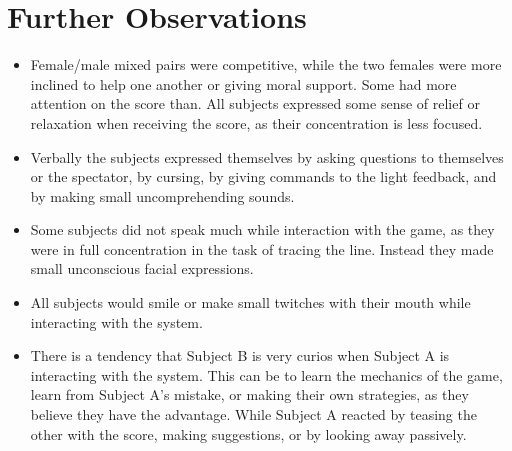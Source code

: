 \section*{Further Observations}\label{fo}
\begin{itemize}
\item Female/male mixed pairs were competitive, while the two females were more inclined to help one another or giving moral support. Some had more attention on the score than. All subjects expressed some sense of relief or relaxation when receiving the score, as their concentration is less focused. 
\item Verbally the subjects expressed themselves by asking questions to themselves or the spectator, by cursing, by giving commands to the light feedback, and by making small uncomprehending sounds. 
\item Some subjects did not speak much while interaction with the game, as they were in full concentration in the task of tracing the line. Instead they made small unconscious facial expressions.
\item All subjects would smile or make small twitches with their mouth while interacting with the system.
\item There is a tendency that Subject B is very curios when Subject A is interacting with the system. This can be to learn the mechanics of the game, learn from Subject A’s mistake, or making their own strategies, as they believe they have the advantage. While Subject A reacted by teasing the other with the score, making suggestions, or by looking away passively.
\end{itemize}
